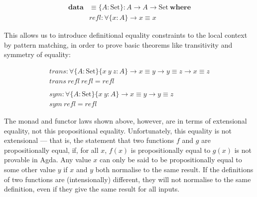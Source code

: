 \documentclass[a4paper]{jfp}
\begin{document}
\begin{displaymath}
	\begin{array}{ll}
	\textbf{data} &\! \equiv \{A : \text{Set}\} : A \rightarrow A \rightarrow \text{Set}\ \textbf{where} \\
	              &\! \mathit{refl} : \forall \{x : A\} \rightarrow x \equiv x
    \end{array}
\end{displaymath}

\medskip

This allows us to introduce definitional equality constraints to the local context by pattern matching, in order to prove basic theorems like
transitivity and symmetry of equality:

\begin{displaymath}
	\begin{array}{l}
		\mathit{trans} :  \forall \{A : \text{Set}\}\{x\ y\ z : A\} \rightarrow x \equiv y \rightarrow y \equiv z \rightarrow x \equiv z \\
		\mathit{trans}\ \mathit{refl}\ \mathit{refl} = \mathit{refl} \\
		\\
		\mathit{sym} : \forall \{A : \text{Set}\}\{x\ y : A\} \rightarrow x \equiv y \rightarrow y \equiv z \\
		\mathit{sym}\ \mathit{refl} = \mathit{refl}
    \end{array}
\end{displaymath}

The monad and functor laws shown above, however, are in terms of extensional equality, not this propositional equality. Unfortunately, this equality
is not extensional --- that is, the statement that two functions $f$ and $g$ are propositionally equal, if, for all $x$, $f(x)$ is propositionally
equal to $g(x)$ is not provable in Agda. Any value $x$ can only be said to be propositionally equal to some other value $y$ if $x$ and $y$ both
normalise to the same result. If the definitions of two functions are (intensionally) different, they will not normalise to the same definition, even
if they give the same result for all inputs.
\end{document}
